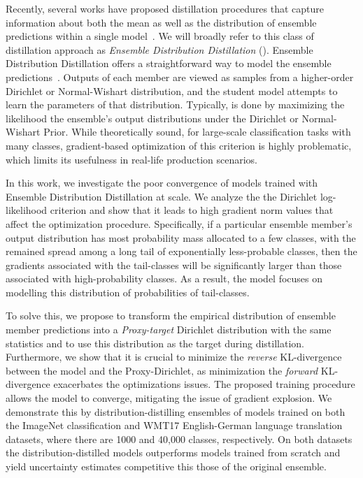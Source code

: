 
Recently, several works have proposed distillation procedures that capture information about both the mean as well as the distribution of ensemble predictions within a single model~\cite{malinin-endd-2019,hydra,mdd,malinin2020regression}. We will broadly refer to this class of distillation approach as \emph{Ensemble Distribution Distillation} (\Endd). Ensemble Distribution Distillation offers a straightforward way to model the ensemble predictions~\cite{malinin-endd-2019,malinin2020regression}. Outputs of each member are viewed as samples from a higher-order Dirichlet or Normal-Wishart distribution, and the student model attempts to learn the parameters of that distribution. Typically, \Endd is done by maximizing the likelihood the ensemble's output distributions under the Dirichlet or Normal-Wishart Prior. While theoretically sound, for large-scale classification tasks with many classes, gradient-based optimization of this criterion is highly problematic, which limits its usefulness in real-life production scenarios.

In this work, we investigate the poor convergence of models trained with Ensemble Distribution Distillation at scale. We analyze the the Dirichlet log-likelihood criterion and show that it leads to high gradient norm values that affect the optimization procedure. Specifically, if a particular ensemble member's output distribution has most probability mass allocated to a few classes, with the remained spread among a long tail of exponentially less-probable classes, then the gradients associated with the tail-classes will be significantly larger than those associated with high-probability classes. As a result, the model focuses on modelling this distribution of probabilities of tail-classes.

To solve this, we propose to transform the empirical distribution of ensemble member predictions into a \emph{Proxy-target} Dirichlet distribution with the same statistics and to use this distribution as the target during distillation. Furthermore, we show that it is crucial to minimize the \emph{reverse} KL-divergence between the model and the Proxy-Dirichlet, as minimization the \emph{forward} KL-divergence exacerbates the optimizations issues. The proposed training procedure allows the model to converge, mitigating the issue of gradient explosion. We demonstrate this by distribution-distilling ensembles of models trained on both the ImageNet classification and WMT17 English-German language translation datasets, where there are 1000 and 40,000 classes, respectively. On both datasets the distribution-distilled models outperforms models trained from scratch and yield uncertainty estimates competitive this those of the original ensemble. 

